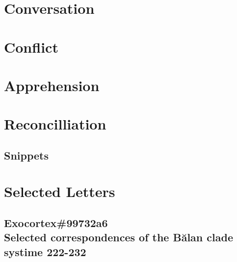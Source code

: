 \documentclass[11pt]{memoir}
\begin{document}
  \part{Conversation}

  
  

  

  \part{Conflict}

  \part{Apprehension}

  \part{Reconcilliation}

  \chapter*{Snippets}
  
  

  \part*{Selected Letters}

  \chapter*{Exocortex\#99732a6 \\ Selected correspondences of the Bălan clade \\ systime 222-232}

  

  \backmatter

  \markboth{}{}


  
\end{document}
